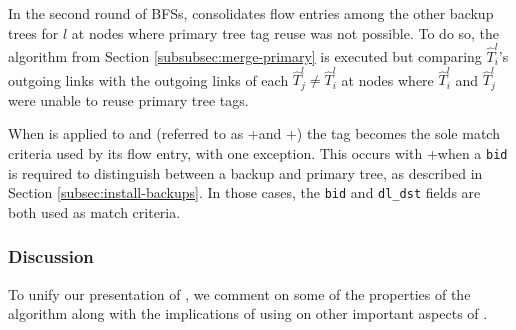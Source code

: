 In the second round of BFSs, \merge consolidates flow entries among the other backup trees for $l$
at nodes where primary tree tag reuse was not possible.  
To do so, the algorithm from Section \ref{subsubsec:merge-primary} is executed but comparing $\hat{T}_i^l$'s outgoing links with the outgoing links of 
each $\hat{T}_j^l \neq \hat{T}_i^l$ at nodes where $\hat{T}_i^l$ and $\hat{T}_j^l$ were unable to reuse primary tree tags. 

When \merge is applied to \pre and \post (referred to as \pres+\merge and \posts+\merges) the tag becomes the sole match criteria used by its flow entry, with one exception.  This 
occurs with \pres+\merge when a {\tt bid} is required to distinguish between a backup and primary tree, as described in Section \ref{subsec:install-backups}. In those cases, the 
{\tt bid} and {\tt dl\_dst} fields are both used as match criteria.





\subsubsection{\mergen Discussion}
\label{subsubsec:merge-discuss}

To unify our presentation of \merges, we comment on some of the properties of the algorithm along with the implications of using \merge on other important aspects of \mdrs.

